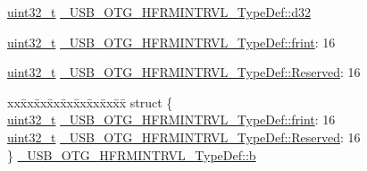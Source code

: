 \begin{DoxyCompactItemize}
\begin{tabbing}
\end{tabbing}\item 
\hyperlink{stdint_8h_a435d1572bf3f880d55459d9805097f62}{uint32\-\_\-t} \hyperlink{group___u_s_b___o_t_g___d_r_i_v_e_r_ga9f687d93bf8619d44c7bba5478bf9362}{\-\_\-\-U\-S\-B\-\_\-\-O\-T\-G\-\_\-\-H\-F\-R\-M\-I\-N\-T\-R\-V\-L\-\_\-\-Type\-Def\-::d32}
\item 
\hyperlink{stdint_8h_a435d1572bf3f880d55459d9805097f62}{uint32\-\_\-t} \hyperlink{group___u_s_b___o_t_g___d_r_i_v_e_r_ga6710e8bdf4a117215581628f7cf8ad57}{\-\_\-\-U\-S\-B\-\_\-\-O\-T\-G\-\_\-\-H\-F\-R\-M\-I\-N\-T\-R\-V\-L\-\_\-\-Type\-Def\-::frint}\-: 16
\item 
\hyperlink{stdint_8h_a435d1572bf3f880d55459d9805097f62}{uint32\-\_\-t} \hyperlink{group___u_s_b___o_t_g___d_r_i_v_e_r_ga113e497b721389ae73ab4479a2bc5601}{\-\_\-\-U\-S\-B\-\_\-\-O\-T\-G\-\_\-\-H\-F\-R\-M\-I\-N\-T\-R\-V\-L\-\_\-\-Type\-Def\-::\-Reserved}\-: 16
\item 
\begin{tabbing}
xx\=xx\=xx\=xx\=xx\=xx\=xx\=xx\=xx\=\kill
struct \{\\
\>\hyperlink{stdint_8h_a435d1572bf3f880d55459d9805097f62}{uint32\_t} \hyperlink{group___u_s_b___o_t_g___d_r_i_v_e_r_ga6710e8bdf4a117215581628f7cf8ad57}{\_USB\_OTG\_HFRMINTRVL\_TypeDef::frint}: 16\\
\>\hyperlink{stdint_8h_a435d1572bf3f880d55459d9805097f62}{uint32\_t} \hyperlink{group___u_s_b___o_t_g___d_r_i_v_e_r_ga113e497b721389ae73ab4479a2bc5601}{\_USB\_OTG\_HFRMINTRVL\_TypeDef::Reserved}: 16\\
\} \hyperlink{group___u_s_b___o_t_g___d_r_i_v_e_r_ga718ffaa7de28efab5036c4b914725c50}{\_USB\_OTG\_HFRMINTRVL\_TypeDef::b}\\


\end{tabbing}
\end{DoxyCompactItemize}
